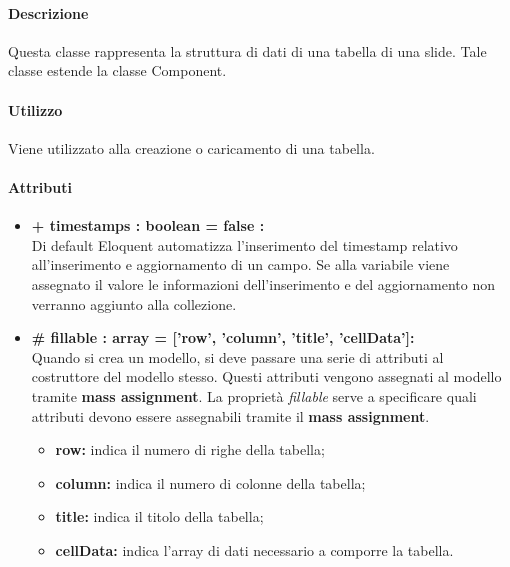 	\paragraph{Descrizione}
	Questa classe rappresenta la struttura di dati di una tabella di una \gls{slide}. Tale classe estende la classe Component.
	
	\paragraph{Utilizzo}
	Viene utilizzato alla creazione o caricamento di una tabella.
	
	\paragraph{Attributi}
	\begin{itemize}
		\item \textbf{+ timestamps : boolean = false :}\\
		Di default Eloquent automatizza l'inserimento del timestamp relativo all'inserimento e aggiornamento di un campo. Se alla variabile viene assegnato il valore le informazioni dell'inserimento e del aggiornamento non verranno aggiunto alla collezione.
		\item \textbf{\# fillable : array = [’row’, ’column’, ’title’, ’cellData’]:}\\
		Quando si crea un modello, si deve passare una serie di attributi al costruttore del modello stesso. Questi attributi vengono assegnati al modello tramite \textbf{mass assignment}. La proprietà \textit{fillable} serve a specificare quali attributi devono essere assegnabili tramite il \textbf{mass assignment}.
		\begin{itemize}
			\item \textbf{row:} indica il numero di righe della tabella;
			\item \textbf{column:} indica il numero di colonne della tabella;
			\item \textbf{title:} indica il titolo della tabella;
			\item \textbf{cellData:} indica l'array di dati necessario a comporre la tabella.
		\end{itemize}
	\end{itemize}
